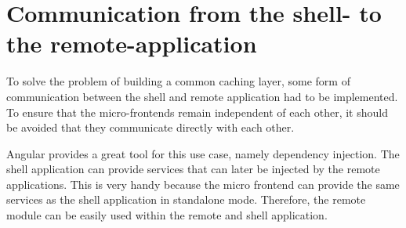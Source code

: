 

\fi

\section{Communication from the shell- to the remote-application}\label{section:methods:communication-shell-remote}

To solve the problem of building a common caching layer, some form of communication between the shell and remote application had to be implemented. To ensure that the micro-frontends remain independent of each other, it should be avoided that they communicate directly with each other.

Angular provides a great tool for this use case, namely dependency injection. The shell application can provide services that can later be injected by the remote applications. This is very handy because the micro frontend can provide the same services as the shell application in standalone mode. Therefore, the remote module can be easily used within the remote and shell application.

\ifshowUnusedContent

